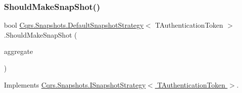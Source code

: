 \subsubsection{\texorpdfstring{Should\+Make\+Snap\+Shot()}{ShouldMakeSnapShot()}}
{\footnotesize\ttfamily bool \hyperlink{classCqrs_1_1Snapshots_1_1DefaultSnapshotStrategy}{Cqrs.\+Snapshots.\+Default\+Snapshot\+Strategy}$<$ T\+Authentication\+Token $>$.Should\+Make\+Snap\+Shot (\begin{DoxyParamCaption}\item[{\hyperlink{interfaceCqrs_1_1Domain_1_1IAggregateRoot}{I\+Aggregate\+Root}$<$ T\+Authentication\+Token $>$}]{aggregate }\end{DoxyParamCaption})}



Implements \hyperlink{interfaceCqrs_1_1Snapshots_1_1ISnapshotStrategy_ab1d54cd76c7ac832329cb3a6de0effcd_ab1d54cd76c7ac832329cb3a6de0effcd}{Cqrs.\+Snapshots.\+I\+Snapshot\+Strategy$<$ T\+Authentication\+Token $>$}.

